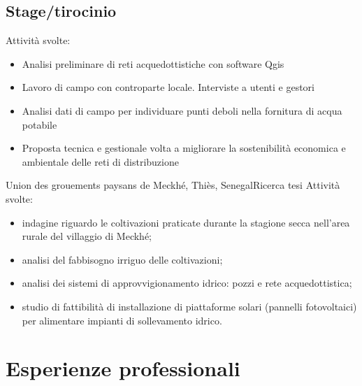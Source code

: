 \documentclass[12pt,a4paper,sans]{moderncv} %
\begin{document}
\subsection{Stage/tirocinio}
Attività svolte:
\begin{itemize}
\item Analisi preliminare di reti acquedottistiche con software Qgis
\item Lavoro di campo con controparte locale. Interviste a utenti e gestori
\item Analisi dati di campo per individuare punti deboli nella fornitura di acqua potabile
\item Proposta tecnica e gestionale volta a migliorare la sostenibilità economica e ambientale delle reti di distribuzione
\end{itemize}
\medskip
{} {Union des grouements paysans de Meckhé, Thiès, Senegal}{Ricerca tesi}{}{}{}
Attività svolte: 
\begin{itemize}
\item indagine riguardo le coltivazioni praticate durante la stagione secca nell'area rurale del villaggio di Meckhé; 
\item analisi del fabbisogno irriguo delle coltivazioni;
\item analisi dei sistemi di approvvigionamento idrico: pozzi e rete acquedottistica;
\item studio di fattibilità di installazione di piattaforme solari (pannelli fotovoltaici) per alimentare impianti di sollevamento idrico.
\end{itemize}
%
%


\section{Esperienze professionali}
\end{document}
